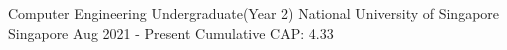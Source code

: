 

\begin{cventries}

	\cventry
	{Computer Engineering Undergraduate(Year 2)}
	{National University of Singapore}
	{Singapore}
	{Aug 2021 - Present}
	{Cumulative CAP: 4.33}

\end{cventries}